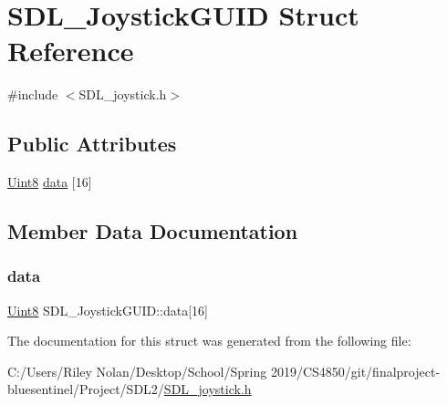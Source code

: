 \hypertarget{struct_s_d_l___joystick_g_u_i_d}{}\section{S\+D\+L\+\_\+\+Joystick\+G\+U\+ID Struct Reference}
\label{struct_s_d_l___joystick_g_u_i_d}


{\ttfamily \#include $<$S\+D\+L\+\_\+joystick.\+h$>$}

\subsection*{Public Attributes}
\begin{DoxyCompactItemize}
\item 
\mbox{\hyperlink{_s_d_l__stdinc_8h_a2944638813a090aa23e62f4da842c3e2}{Uint8}} \mbox{\hyperlink{struct_s_d_l___joystick_g_u_i_d_a16935b928a608fe98e0509f242590597}{data}} \mbox{[}16\mbox{]}
\end{DoxyCompactItemize}


\subsection{Member Data Documentation}
\mbox{\label{struct_s_d_l___joystick_g_u_i_d_a16935b928a608fe98e0509f242590597}} 
\subsubsection{\texorpdfstring{data}{data}}
{\footnotesize\ttfamily \mbox{\hyperlink{_s_d_l__stdinc_8h_a2944638813a090aa23e62f4da842c3e2}{Uint8}} S\+D\+L\+\_\+\+Joystick\+G\+U\+I\+D\+::data\mbox{[}16\mbox{]}}



The documentation for this struct was generated from the following file\+:\begin{DoxyCompactItemize}
\item 
C\+:/\+Users/\+Riley Nolan/\+Desktop/\+School/\+Spring 2019/\+C\+S4850/git/finalproject-\/bluesentinel/\+Project/\+S\+D\+L2/\mbox{\hyperlink{_s_d_l__joystick_8h}{S\+D\+L\+\_\+joystick.\+h}}\end{DoxyCompactItemize}
